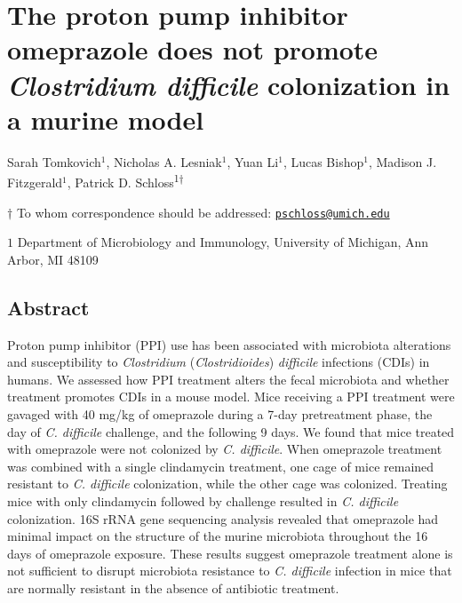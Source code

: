 \documentclass[11pt,]{article}
\title{}
\author{}
\date{}
\begin{document}
\vspace{35mm}

\section{\texorpdfstring{The proton pump inhibitor omeprazole does not
promote \emph{Clostridium difficile} colonization in a murine
model}{The proton pump inhibitor omeprazole does not promote Clostridium difficile colonization in a murine model}}\label{the-proton-pump-inhibitor-omeprazole-does-not-promote-clostridium-difficile-colonization-in-a-murine-model}

\vspace{35mm}

Sarah Tomkovich\({^1}\), Nicholas A. Lesniak\({^1}\), Yuan Li\({^1}\),
Lucas Bishop\({^1}\), Madison J. Fitzgerald\({^1}\), Patrick D.
Schloss\textsuperscript{1\(\dagger\)}

\vspace{40mm}

\(\dagger\) To whom correspondence should be addressed:
\href{mailto:pschloss@umich.edu}{\nolinkurl{pschloss@umich.edu}}

\(1\) Department of Microbiology and Immunology, University of Michigan,
Ann Arbor, MI 48109

\newpage

\linenumbers

\subsection{Abstract}\label{abstract}

Proton pump inhibitor (PPI) use has been associated with microbiota
alterations and susceptibility to \emph{Clostridium}
(\emph{Clostridioides}) \emph{difficile} infections (CDIs) in humans. We
assessed how PPI treatment alters the fecal microbiota and whether
treatment promotes CDIs in a mouse model. Mice receiving a PPI treatment
were gavaged with 40 mg/kg of omeprazole during a 7-day pretreatment
phase, the day of \emph{C. difficile} challenge, and the following 9
days. We found that mice treated with omeprazole were not colonized by
\emph{C. difficile}. When omeprazole treatment was combined with a
single clindamycin treatment, one cage of mice remained resistant to
\emph{C. difficile} colonization, while the other cage was colonized.
Treating mice with only clindamycin followed by challenge resulted in
\emph{C. difficile} colonization. 16S rRNA gene sequencing analysis
revealed that omeprazole had minimal impact on the structure of the
murine microbiota throughout the 16 days of omeprazole exposure. These
results suggest omeprazole treatment alone is not sufficient to disrupt
microbiota resistance to \emph{C. difficile} infection in mice that are
normally resistant in the absence of antibiotic treatment.
\end{document}
